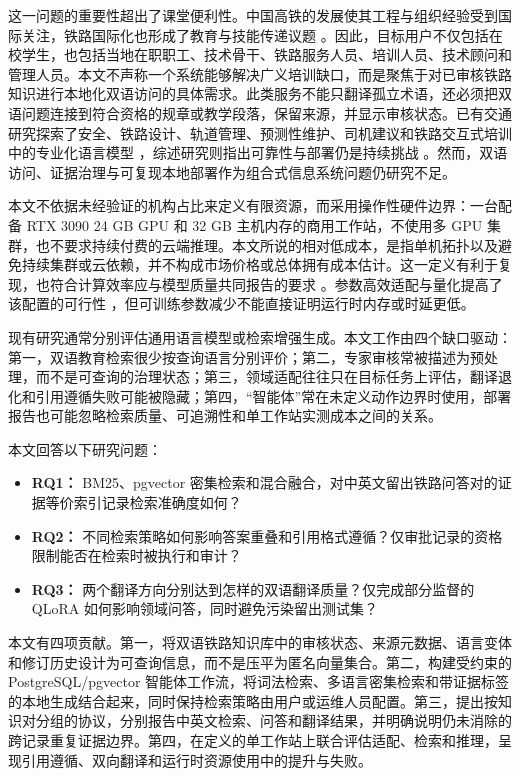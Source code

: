 这一问题的重要性超出了课堂便利性。中国高铁的发展使其工程与组织经验受到国际关注，铁路国际化也形成了教育与技能传递议题 \citep{lawrence2019hsr,xu2018education}。因此，目标用户不仅包括在校学生，也包括当地在职职工、技术骨干、铁路服务人员、培训人员、技术顾问和管理人员。本文不声称一个系统能够解决广义培训缺口，而是聚焦于对已审核铁路知识进行本地化双语访问的具体需求。此类服务不能只翻译孤立术语，还必须把双语问题连接到符合资格的规章或教学段落，保留来源，并显示审核状态。已有交通研究探索了安全、铁路设计、轨道管理、预测性维护、司机建议和铁路交互式培训中的专业化语言模型 \citep{zheng2023trafficsafety,lahnalampi2024rail,wang2024phm,song2025railway,luo2025driver,li2025training}，综述研究则指出可靠性与部署仍是持续挑战 \citep{wandelt2024transport}。然而，双语访问、证据治理与可复现本地部署作为组合式信息系统问题仍研究不足。

本文不依据未经验证的机构占比来定义有限资源，而采用操作性硬件边界：一台配备 RTX 3090 24 GB GPU 和 32 GB 主机内存的商用工作站，不使用多 GPU 集群，也不要求持续付费的云端推理。本文所说的相对低成本，是指单机拓扑以及避免持续集群或云依赖，并不构成市场价格或总体拥有成本估计。这一定义有利于复现，也符合计算效率应与模型质量共同报告的要求 \citep{schwartz2020green}。参数高效适配与量化提高了该配置的可行性 \citep{dettmers2023qlora,ding2023peft,lv2024full,wang2025peft}，但可训练参数减少不能直接证明运行时内存或时延更低。

现有研究通常分别评估通用语言模型或检索增强生成。本文工作由四个缺口驱动：第一，双语教育检索很少按查询语言分别评价；第二，专家审核常被描述为预处理，而不是可查询的治理状态；第三，领域适配往往只在目标任务上评估，翻译退化和引用遵循失败可能被隐藏；第四，“智能体”常在未定义动作边界时使用，部署报告也可能忽略检索质量、可追溯性和单工作站实测成本之间的关系。

本文回答以下研究问题：

\begin{itemize}
\item \textbf{RQ1：} BM25、pgvector 密集检索和混合融合，对中英文留出铁路问答对的证据等价索引记录检索准确度如何？
\item \textbf{RQ2：} 不同检索策略如何影响答案重叠和引用格式遵循？仅审批记录的资格限制能否在检索时被执行和审计？
\item \textbf{RQ3：} 两个翻译方向分别达到怎样的双语翻译质量？仅完成部分监督的 QLoRA 如何影响领域问答，同时避免污染留出测试集？
\end{itemize}

本文有四项贡献。第一，将双语铁路知识库中的审核状态、来源元数据、语言变体和修订历史设计为可查询信息，而不是压平为匿名向量集合。第二，构建受约束的 PostgreSQL/pgvector 智能体工作流，将词法检索、多语言密集检索和带证据标签的本地生成结合起来，同时保持检索策略由用户或运维人员配置。第三，提出按知识对分组的协议，分别报告中英文检索、问答和翻译结果，并明确说明仍未消除的跨记录重复证据边界。第四，在定义的单工作站上联合评估适配、检索和推理，呈现引用遵循、双向翻译和运行时资源使用中的提升与失败。

